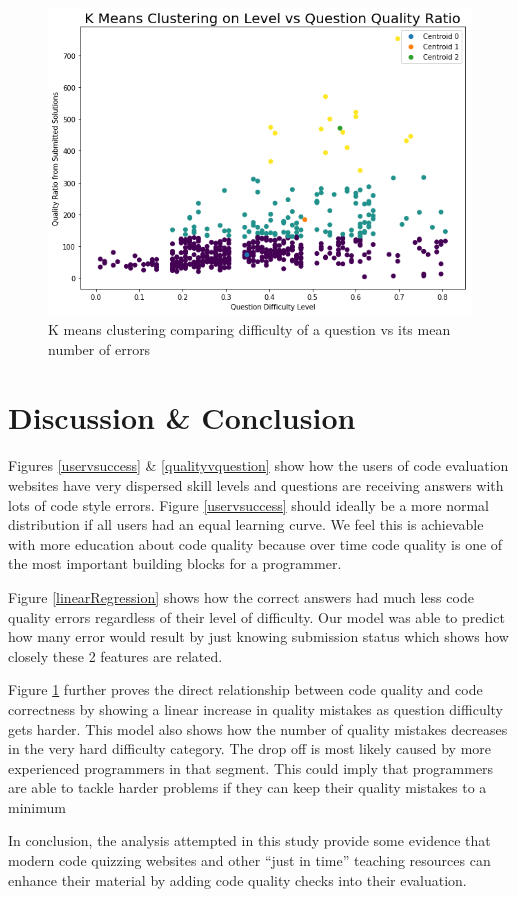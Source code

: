 \documentclass{article}
\begin{document}
\begin{figure}[ht] \vskip 0.2in \begin{center}
\centerline{\includegraphics[width=\columnwidth]{../images/kmeans.png}}
\caption{ K means clustering comparing difficulty of a question vs its mean number of errors } \label{kmeans} \end{center} \vskip -0.2in \end{figure}

\section{Discussion \& Conclusion}\label{discussion-conclusion}

Figures \ref{uservsuccess} \& \ref{qualityvquestion} show how the users
of code evaluation websites have very dispersed skill levels and
questions are receiving answers with lots of code style errors. Figure
\ref{uservsuccess} should ideally be a more normal distribution if all
users had an equal learning curve. We feel this is achievable with more
education about code quality because over time code quality is one of
the most important building blocks for a programmer.

Figure \ref{linearRegression} shows how the correct answers had much
less code quality errors regardless of their level of difficulty. Our
model was able to predict how many error would result by just knowing
submission status which shows how closely these 2 features are related.

Figure \ref{kmeans} further proves the direct relationship between code
quality and code correctness by showing a linear increase in quality
mistakes as question difficulty gets harder. This model also shows how
the number of quality mistakes decreases in the very hard difficulty
category. The drop off is most likely caused by more experienced
programmers in that segment. This could imply that programmers are able
to tackle harder problems if they can keep their quality mistakes to a
minimum

In conclusion, the analysis attempted in this study provide some
evidence that modern code quizzing websites and other ``just in time''
teaching resources can enhance their material by adding code quality
checks into their evaluation.



\end{document}

